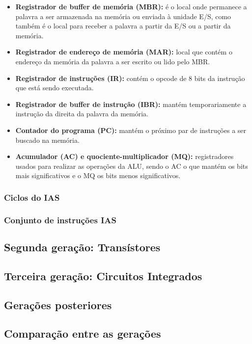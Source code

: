 \documentclass{article}
\begin{document}
\begin{itemize}
    \item \textbf{Registrador de buffer de memória (MBR):} é o local onde permanece
            a palavra a ser armazenada na memória ou enviada à unidade E/S,
            como também é o local para receber a palavra a partir da E/S ou a
            partir da memória.
        \item \textbf{Registrador de endereço de memória (MAR):} local que contém o
            endereço da memória da palavra a ser escrito ou lido pelo MBR.
        \item \textbf{Registrador de instruções (IR):} contém o opcode de 8 bits da
            instrução que está sendo executada.
        \item \textbf{Registrador de buffer de instrução (IBR):} mantém temporariamente
            a instrução da direita da palavra da memória.
        \item \textbf{Contador do programa (PC):} mantém o próximo par de instruções a
            ser buscado na memória.
        \item \textbf{Acumulador (AC) e quociente-multiplicador (MQ):} registradores
            usados para realizar as operações da ALU, sendo o AC o que mantém
            os bits mais significativos e o MQ os bits menos significativos.
\end{itemize}

\subsubsection{Ciclos do IAS}
\subsubsection{Conjunto de instruções IAS}
\subsection{Segunda geração: Transístores}
\subsection{Terceira geração: Circuitos Integrados}
\subsection{Gerações posteriores}
\subsection{Comparação entre as gerações}
\end{document}
